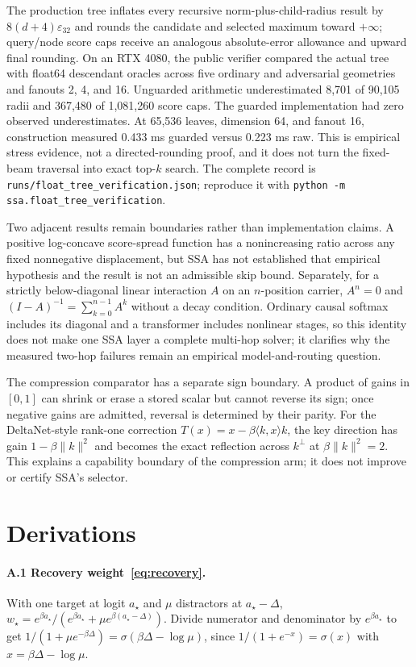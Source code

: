 \documentclass[11pt]{article}
\numberwithin{equation}{section}
\newcommand{\inner}[2]{\langle #1, #2\rangle}
\begin{document}
The production tree inflates every recursive norm-plus-child-radius result by
$8(d+4)\varepsilon_{32}$ and rounds the candidate and selected maximum toward $+\infty$; query/node score
caps receive an analogous absolute-error allowance and upward final rounding. On an RTX 4080, the public
verifier compared the actual tree with float64 descendant oracles across five ordinary and adversarial
geometries and fanouts 2, 4, and 16. Unguarded arithmetic underestimated 8,701 of 90,105 radii and 367,480 of
1,081,260 score caps. The guarded implementation had zero observed underestimates. At 65,536 leaves,
dimension 64, and fanout 16, construction measured 0.433 ms guarded versus 0.223 ms raw. This is empirical
stress evidence, not a directed-rounding proof, and it does not turn the fixed-beam traversal into exact
top-$k$ search. The complete record is \texttt{runs/float\_tree\_verification.json}; reproduce it with
\texttt{python -m ssa.float\_tree\_verification}.

Two adjacent results remain boundaries rather than implementation claims. A positive log-concave score-spread
function has a nonincreasing ratio across any fixed nonnegative displacement, but SSA has not established that
empirical hypothesis and the result is not an admissible skip bound. Separately, for a strictly
below-diagonal linear interaction $A$ on an $n$-position carrier, $A^n=0$ and
$(I-A)^{-1}=\sum_{k=0}^{n-1}A^k$ without a decay condition. Ordinary causal softmax includes its diagonal and
a transformer includes nonlinear stages, so this identity does not make one SSA layer a complete multi-hop
solver; it clarifies why the measured two-hop failures remain an empirical model-and-routing question.

The compression comparator has a separate sign boundary. A product of gains in $[0,1]$ can shrink or erase a
stored scalar but cannot reverse its sign; once negative gains are admitted, reversal is determined by their
parity. For the DeltaNet-style rank-one correction $T(x)=x-\beta\inner{k}{x}k$, the key direction has gain
$1-\beta\lVert k\rVert^2$ and becomes the exact reflection across $k^\perp$ at
$\beta\lVert k\rVert^2=2$. This explains a capability boundary of the compression arm; it does not improve or
certify SSA's selector.

\appendix
\section{Derivations}

\paragraph{A.1 Recovery weight~\eqref{eq:recovery}.} With one target at logit $a_\star$ and $\mu$ distractors
at $a_\star-\Delta$, $w_\star=e^{\beta a_\star}/(e^{\beta a_\star}+\mu e^{\beta(a_\star-\Delta)})$. Divide
numerator and denominator by $e^{\beta a_\star}$ to get $1/(1+\mu e^{-\beta\Delta})=\sigma(\beta\Delta-\log\mu)$,
since $1/(1+e^{-x})=\sigma(x)$ with $x=\beta\Delta-\log\mu$.
\end{document}
